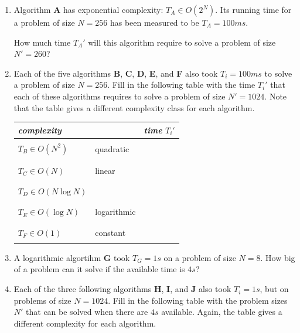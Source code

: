 \documentclass[a4paper]{article}
\begin{document}
\begin{enumerate}
  
\item
  Algorithm \textbf{A} has exponential complexity: $T_A\in O(2^N)$.
  Its running time for a problem of size $N=256$ has been measured to be $T_A=100ms$.
  
  How much time $T_A'$ will this algorithm require to solve a problem of size $N'=260$?

\item
  Each of the five algorithms \textbf{B}, \textbf{C}, \textbf{D}, \textbf{E}, and \textbf{F} also took $T_i=100ms$ to solve a problem of size $N=256$.
  Fill in the following table with the time $T_i'$ that each of these algorithms requires to solve a problem of size $N'=1024$.
  Note that the table gives a different complexity class for each algorithm.
  
  \begin{tabular}{|p{}l|p{}|}
    \hline
    \emph{complexity} && \emph{time} $T_i'$ \\
    \hline
    && \\
    $T_B\in O(N^2)$ & quadratic & \\
    && \\
    \hline
    && \\
    $T_C\in O(N)$ & linear & \\
    && \\
    \hline
    && \\
    $T_D\in O(N\log N)$ && \\
    && \\
    \hline
    && \\
    $T_E\in O(\log N)$ & logarithmic & \\
    && \\
    \hline
    && \\
    $T_F\in O(1)$ & constant & \\
    && \\
    \hline
  \end{tabular}
  
\item
  A logarithmic algortihm \textbf{G} took $T_G=1s$ on a problem of size $N=8$.
  How big of a problem can it solve if the available time is $4s$?
  
\item
  Each of the three following algorithms \textbf{H}, \textbf{I}, and \textbf{J} also took $T_i=1s$, but on problems of size $N=1024$.
  Fill in the following table with the problem sizes $N'$ that can be solved when there are $4s$ available.
  Again, the table gives a different complexity for each algorithm.
  

\end{enumerate}
\end{document}
